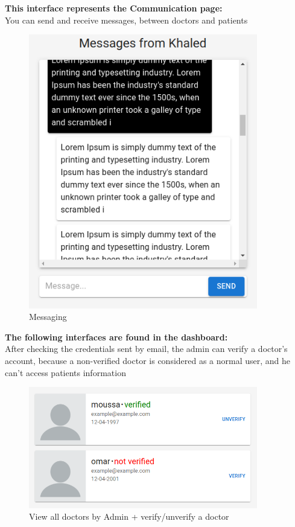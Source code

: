         
        \noindent \textbf{This interface represents the Communication page:} \\
        You can send and receive messages, between doctors and patients
        \begin{figure}[H]
        \begin{center}
        \includegraphics[width=10cm]{./diagnosis-system/presentation-of-app/messeges.png}
        \end{center}
        \caption{Messaging}
        \label{fig:}
        \end{figure}

        
        \noindent \textbf{The following interfaces are found in the dashboard:} \\
        After checking the credentials sent by email, the admin can verify a doctor's account, because a non-verified doctor is considered as a normal user, and he can't access patients information 
        \begin{figure}[H]
        \begin{center}
        \includegraphics[width=10cm]{./diagnosis-system/presentation-of-app/verify-doctors.png}
        \end{center}
        \caption{View all doctors by Admin + verify/unverify a doctor}
        \label{fig:}
        \end{figure}


